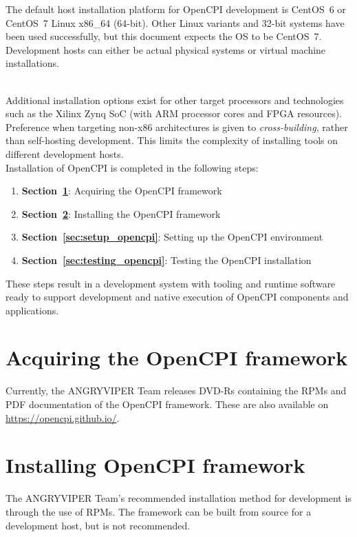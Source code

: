 The default host installation platform for OpenCPI development is CentOS~6 or CentOS~7 Linux x86\_64 (64-bit). Other Linux variants and 32-bit systems have been used successfully, but this document expects the OS to be CentOS~7. Development hosts can either be actual physical systems or virtual machine installations.\\
\begin{center}
\end{center}
\ \\ %
Additional installation options exist for other target processors and technologies such as the Xilinx Zynq SoC (with ARM processor cores and FPGA resources). Preference when targeting non-x86 architectures is given to \textit{cross-building}, rather than self-hosting development. This limits the complexity of installing tools on different development hosts.\\

Installation of OpenCPI is completed in the following steps:
\begin{enumerate}
\item\textbf{Section~\ref{sec:acquiring_opencpi}}: Acquiring the OpenCPI framework
\item\textbf{Section~\ref{sec:install_opencpi}}: Installing the OpenCPI framework
\item\textbf{Section~\ref{sec:setup_opencpi}}: Setting up the OpenCPI environment
\item\textbf{Section~\ref{sec:testing_opencpi}}: Testing the OpenCPI installation
\end{enumerate}
These steps result in a development system with tooling and runtime software ready to support development and native execution of OpenCPI components and applications.

\section{Acquiring the OpenCPI framework}
\label{sec:acquiring_opencpi}
Currently, the ANGRYVIPER Team releases DVD-Rs containing the RPMs and PDF documentation of the OpenCPI framework. These are also available on \url{https://opencpi.github.io/}.

\section{Installing OpenCPI framework}
\label{sec:install_opencpi}
The ANGRYVIPER Team's recommended installation method for development is through the use of RPMs. The framework can be built from source for a development host, but is not recommended.\\

